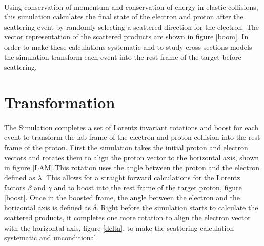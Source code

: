 \paragraph{}
Using conservation of momentum and conservation of energy in elastic collisions, this simulation calculates the final state of the electron and proton after the scattering event by randomly selecting a scattered direction for the electron. The vector representation of the scattered products are shown in figure \ref{boom}. In order to make these calculations systematic and to study cross sections models the simulation transform each event into the rest frame of the target before scattering. 

\section{Transformation}\paragraph{}
The Simulation completes a set of Lorentz invariant  rotations and boost for each event to transform the lab frame of the electron and proton collision into the rest frame of the proton. First the simulation takes the initial proton and electron vectors and rotates them to align the proton vector to the horizontal axis, shown in figure \ref{LAM}.This rotation uses the angle between the proton and the electron defined as $\lambda$. This allows for a straight forward calculations for the Lorentz factors $\beta$ and $\gamma $ and to boost into the rest frame of the target proton, figure \ref{boost}. Once in the boosted frame, the angle between the electron and the horizontal axis is defined as $\delta$.  Right before the simulation starts to calculate the scattered products, it completes one more rotation to align the electron vector with the horizontal axis, figure \ref{delta}, to make the scattering calculation systematic and unconditional. 

